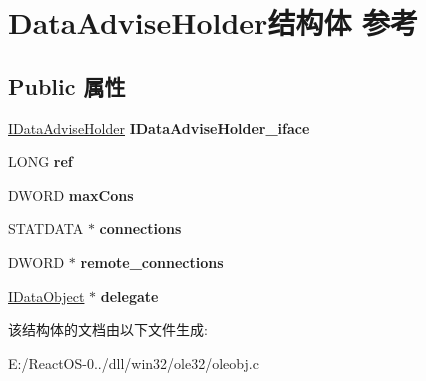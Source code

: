 \hypertarget{struct_data_advise_holder}{}\section{Data\+Advise\+Holder结构体 参考}
\label{struct_data_advise_holder}
\subsection*{Public 属性}
\begin{DoxyCompactItemize}
\item 
\mbox{\label{struct_data_advise_holder_a1ca534e52fb32b5ad151c6573343a84f}} 
\hyperlink{interface_i_data_advise_holder}{I\+Data\+Advise\+Holder} {\bfseries I\+Data\+Advise\+Holder\+\_\+iface}
\item 
\mbox{\label{struct_data_advise_holder_a134a1e6755add3c30d8c53588333c23c}} 
L\+O\+NG {\bfseries ref}
\item 
\mbox{\label{struct_data_advise_holder_ab2619b3f24c32c7e260178ca741e8c4c}} 
D\+W\+O\+RD {\bfseries max\+Cons}
\item 
\mbox{\label{struct_data_advise_holder_a854bbed0a04377307bf0e373052312e7}} 
S\+T\+A\+T\+D\+A\+TA $\ast$ {\bfseries connections}
\item 
\mbox{\label{struct_data_advise_holder_a3c74b3b9fabeaa77cf7daaf8f22d92f4}} 
D\+W\+O\+RD $\ast$ {\bfseries remote\+\_\+connections}
\item 
\mbox{\label{struct_data_advise_holder_aa80500346479e1f17526b60cfaee3d7e}} 
\hyperlink{interface_i_data_object}{I\+Data\+Object} $\ast$ {\bfseries delegate}
\end{DoxyCompactItemize}


该结构体的文档由以下文件生成\+:\begin{DoxyCompactItemize}
\item 
E\+:/\+React\+O\+S-\/0../dll/win32/ole32/oleobj.\+c\end{DoxyCompactItemize}
